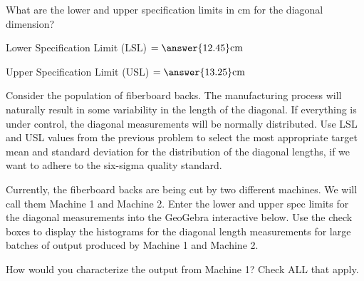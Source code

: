 \documentclass{ximera}
\begin{document}
\begin{question}\label{quest:qc150_1}
What are the lower and upper specification limits in cm for the diagonal dimension?

Lower Specification Limit (LSL) $=\answer{12.45}\text{cm}$

Upper Specification Limit (USL) $=\answer{13.25}\text{cm}$

\end{question}

\begin{question}\label{quest:qc150_2}
    Consider the population of fiberboard backs.  The manufacturing process will naturally result in some variability in the length of the diagonal.  If everything is under control, the diagonal measurements will be normally distributed.  Use LSL and USL values from the previous problem to select the most appropriate target mean and standard deviation for the distribution of the diagonal lengths, if we want to adhere to the six-sigma quality standard.

    \begin{multipleChoice}
    \end{multipleChoice}
\end{question}

Currently, the fiberboard backs are being cut by two different machines.  We will call them Machine 1 and Machine 2.
Enter the lower and upper spec limits for the diagonal measurements into the GeoGebra interactive below.  Use the check boxes to display the histograms for the diagonal length measurements for large batches of output produced by Machine 1 and Machine 2. 

\begin{onlineOnly}
\begin{center} 
\end{center}
\end{onlineOnly}

How would you characterize the output from Machine 1? Check ALL that apply.

\begin{selectAll}
\end{selectAll}
\end{document}
